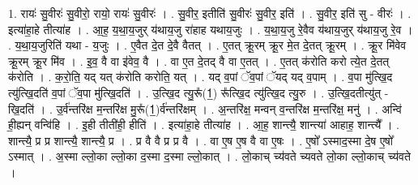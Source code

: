 \documentclass[17pt]{extarticle}
\begin{document}
1. रायः॑ सु॒वीरः॑ सु॒वीरो॒ रायो॒ रायः॑ सु॒वीरः॑ । . सु॒वीर॒ इतीति॑ सु॒वीरः॑ सु॒वीर॒ इति॑ । . सु॒वीर॒ इति॑ सु - वीरः॑ । . इत्या॑हा॒हे तीत्या॑ह । . आ॒ह॒ य॒था॒य॒जुर् य॑थाय॒जु रा॑हाह यथाय॒जुः । . य॒था॒य॒जु रे॒वैव य॑थाय॒जुर् य॑थाय॒जु रे॒व । . य॒था॒य॒जुरिति॑ यथा - य॒जुः । . ए॒वैत दे॒त दे॒वै वैतत् । . ए॒तत् क्रू॒रम् क्रू॒र मे॒त दे॒तत् क्रू॒रम् । . क्रू॒र मि॑वेव क्रू॒रम् क्रू॒र मि॑व । . इ॒व॒ वै वा इ॑वेव॒ वै । . वा ए॒त दे॒तद् वै वा ए॒तत् । . ए॒तत् क॑रोति करो त्ये॒त दे॒तत् क॑रोति । . क॒रो॒ति॒ यद् यत् क॑रोति करोति॒ यत् । . यद् व॒पां ॅव॒पां ॅयद् यद् व॒पाम् । . व॒पा मु॑त्खि॒द त्यु॑त्खि॒दति॑ व॒पां ॅव॒पा मु॑त्खि॒दति॑ । . उ॒त्खि॒द त्यु॒रू᳚(1॒) रू᳚त्खि॒द त्यु॑त्खि॒द त्यु॒रु । . उ॒त्खि॒दतीत्यु॑त् - खि॒दति॑ । . उ॒र्व॑न्तरि॑क्ष म॒न्तरि॑क्ष मु॒रू᳚(1॒)र्व॑न्तरि॑क्षम् । . अ॒न्तरि॑क्ष॒ मन्वन् व॒न्तरि॑क्ष म॒न्तरि॑क्ष॒ मनु॑ । . अन्वि॑ ही॒ह्यन् वन्वि॑हि । . इ॒ही तीती॑ही॒ हीति॑ । . इत्या॑हा॒हे तीत्या॑ह । . आ॒ह॒ शान्त्यै॒ शान्त्या॑ आहाह॒ शान्त्यै᳚ । . शान्त्यै॒ प्र प्र शान्त्यै॒ शान्त्यै॒ प्र । . प्र वै वै प्र प्र वै । . वा ए॒ष ए॒ष वै वा ए॒षः । . ए॒षो᳚ ऽस्माद॒स्मा दे॒ष ए॒षो᳚ ऽस्मात् । . अ॒स्मा ल्लो॒का ल्लो॒का द॒स्मा द॒स्मा ल्लो॒कात् । . लो॒काच् च्य॑वते च्यवते लो॒का ल्लो॒काच् च्य॑वते । \newline
\end{document}
